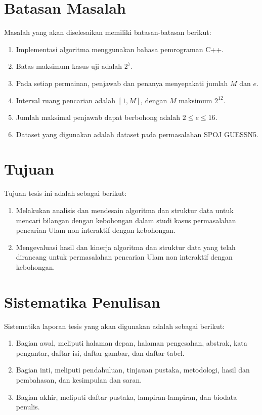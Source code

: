 \section {Batasan Masalah}
Masalah yang akan diselesaikan memiliki batasan-batasan berikut:

\begin {enumerate}
  \item Implementasi algoritma menggunakan bahasa pemrograman C++.
  \item Batas maksimum kasus uji adalah $2^7$.
  \item Pada setiap permainan, penjawab dan penanya menyepakati jumlah $M$ dan $e$.
  \item Interval ruang pencarian adalah $[1,M]$, dengan $M$ maksimum $2^{12}$.
  \item Jumlah maksimal penjawab dapat berbohong adalah $2 \leq e \leq 16$.
  \item Dataset yang digunakan adalah dataset pada permasalahan SPOJ GUESSN5.
\end {enumerate}


\section {Tujuan}
Tujuan tesis ini adalah sebagai berikut:

\begin{enumerate}
  \item Melakukan analisis dan mendesain algoritma dan struktur data untuk mencari bilangan dengan kebohongan dalam studi kasus permasalahan pencarian Ulam non interaktif dengan kebohongan.
  \item Mengevaluasi hasil dan kinerja algoritma dan struktur data yang telah dirancang untuk permasalahan pencarian Ulam non interaktif dengan kebohongan.
\end{enumerate}


\section {Sistematika Penulisan}
Sistematika laporan tesis yang akan digunakan adalah sebagai berikut:

\begin{enumerate}
\item Bagian awal, meliputi halaman depan, halaman pengesahan, abstrak, kata pengantar, daftar isi, daftar gambar, dan daftar tabel.
\item Bagian inti, meliputi pendahuluan, tinjauan pustaka, metodologi, hasil dan pembahasan, dan kesimpulan dan saran.
\item Bagian akhir, meliputi daftar pustaka, lampiran-lampiran, dan biodata penulis.
\end{enumerate}